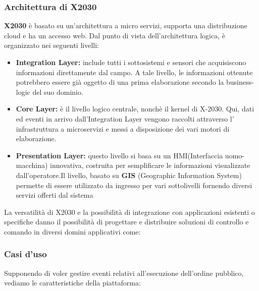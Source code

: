 \subsubsection{Architettura di X2030}
\textbf{X2030} è basato su un'architettura a micro servizi,
supporta una distribuzione cloud e ha un accesso web.
Dal punto di vista dell'architettura logica,
è organizzato nei seguenti livelli:
\begin{itemize}
    \item \textbf{Integration Layer:} include tutti i sottosistemi e
    sensori che acquisiscono informazioni direttamente dal 
    campo. A tale livello, le informazioni ottenute
    potrebbero essere già oggetto di una prima elaborazione
    secondo la business-logic del suo dominio.
    \item \textbf{Core Layer:} è il livello logico centrale, nonchè il
    kernel di X-2030. Qui, dati ed eventi in arrivo
    dall'Integration Layer vengono raccolti attraverso l'
    infrastruttura a microservizi e messi
    a disposizione dei vari motori di elaborazione.
    \item \textbf{Presentation Layer:} questo livello si basa su
    un HMI(Interfaccia uomo-macchina) innovativa, costruita per semplificare le
    informazioni visualizzate dall'operatore.Il livello, basato su 
    \textbf{GIS} (Geographic Information System)
    permette di essere utilizzato da ingresso per vari sottolivelli fornendo
    diversi servizi offerti dal sistema
\end{itemize}



La versatilità di X2030 e la possibilità di integrazione
con applicazioni esistenti o specifiche danno il
possibilità di progettare e distribuire 
soluzioni di controllo e comando in diversi domini applicativi
come:





\subsubsection{Casi d'uso}
Supponendo di voler gestire eventi relativi all'esecuzione 
dell'ordine pubblico, vediamo le caratteristiche della piattaforma:

